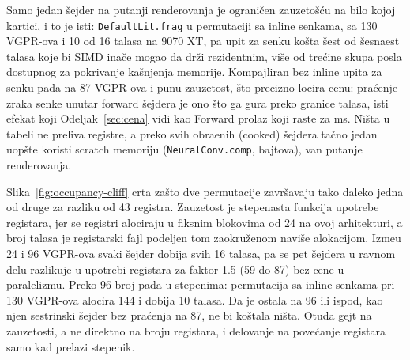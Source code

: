 \begin{table}[tbp]
\caption[\v{S}ejderski registri i teorijska zauzetost]{Registri i teorijska zauzetost klju\v{c}nih \v{s}ejdera na obe grafi\v{c}ke kartice. Za AMD: broj VGPR-ova i
najve\'ci mogu\'ci broj wave32 talasa po SIMD-u (1536 VGPR-ova, granularnost 24, najvi\v{s}e 16). Za
NVIDIA: registri po niti i najve\'ci broj warp-ova po SM-u (65536 registara, najvi\v{s}e 48).
Obe vrednosti su izvedene iz broja registara, a ne izmerene profajlerom.
Generi\v{s}e ih \texttt{tools/gen\_shader\_tables.py} iz commitovanih osnovnih linija.}
\label{tab:occupancy}
\centering

\end{table}

Samo jedan \v{s}ejder na putanji renderovanja je ograni\v{c}en zauzeto\v{s}\'cu na bilo kojoj kartici, i to je isti:
\texttt{DefaultLit.frag} u permutaciji sa inline senkama, sa 130 VGPR-ova i 10 od 16 talasa na
9070 XT, pa upit za senku ko\v{s}ta \v{s}est od \v{s}esnaest talasa koje bi SIMD inače mogao da dr\v{z}i rezidentnim,
vi\v{s}e od tre\'cine skupa posla dostupnog za pokrivanje kašnjenja memorije. Kompajliran bez
inline upita za senku pada na 87 VGPR-ova i punu zauzetost, \v{s}to
precizno locira cenu: pra\'cenje zraka senke unutar forward \v{s}ejdera je ono \v{s}to ga gura preko
granice talasa, isti efekat koji Odeljak~\ref{sec:cena} vidi kao Forward prolaz koji raste za \perfFwdGrowAMD{} ms.
Ni\v{s}ta u tabeli ne preliva registre, a preko svih \rgaShaderCount{} obra\dj{}enih (cooked) \v{s}ejdera ta\v{c}no jedan uop\v{s}te koristi scratch
memoriju (\texttt{NeuralConv.comp}, \rgaScratchBytes{} bajtova), van putanje renderovanja.

Slika~\ref{fig:occupancy-cliff} crta za\v{s}to dve permutacije zavr\v{s}avaju tako daleko jedna od druge za razliku od
43 registra. Zauzetost je stepenasta funkcija upotrebe registara, jer se registri alociraju u fiksnim
blokovima od 24 na ovoj arhitekturi, a broj talasa je registarski fajl podeljen tom zaokru\v{z}enom naviše
alokacijom. Izme\dj{}u 24 i 96 VGPR-ova svaki \v{s}ejder dobija svih 16 talasa, pa se pet \v{s}ejdera u ravnom
delu razlikuje u upotrebi registara za faktor 1.5 (59 do 87) bez cene u paralelizmu. Preko 96
broj pada u stepenima: permutacija sa inline senkama pri 130 VGPR-ova alocira 144 i dobija 10 talasa. Da je
ostala na 96 ili ispod, kao njen sestrinski \v{s}ejder bez pra\'cenja na 87, ne bi ko\v{s}tala ni\v{s}ta. Otuda gejt
na zauzetosti, a ne direktno na broju registara, i delovanje na pove\'canje registara samo kad
prelazi stepenik.

